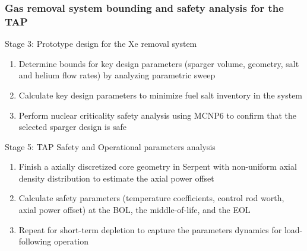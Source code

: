 \begin{frame}
\frametitle{Gas removal system bounding and safety analysis for the TAP}
\begin{block}{Stage 3: Prototype design for the Xe removal system}
	\begin{enumerate}
		\item Determine bounds for key design parameters (sparger volume, 
		geometry, salt and helium flow rates) by analyzing parametric sweep
		\item Calculate key design parameters to minimize fuel salt inventory 
		in the system
		\item Perform nuclear criticality safety analysis using MCNP6 
		\cite{werner_mcnp6._2018} to
confirm that the selected 
		sparger design is safe
	\end{enumerate}
\end{block}

\begin{block}{Stage 5: \gls{TAP} Safety and Operational parameters analysis}
	\begin{enumerate}
		\item Finish a axially discretized core
geometry in Serpent with 
		non-uniform axial density distribution to estimate the axial power
		offset
		\item Calculate safety parameters (temperature coefficients, control 
		rod worth, axial power offset) at the \gls{BOL}, the middle-of-life, 
		and the \gls{EOL}
		\item Repeat for short-term depletion to capture the parameters 
		dynamics for load-following operation
	\end{enumerate}
\end{block}
\end{frame}


